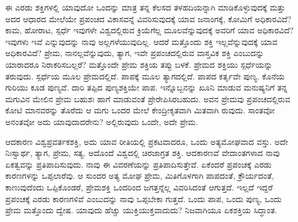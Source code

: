 ಈ ಎರಡು ಶಕ್ತಿಗಳಲ್ಲಿ ಯಾವುದೋ ಒಂದನ್ನು ಮಾತ್ರ ತನ್ನ ಕೆಲಸದ ತಳಹದಿಯನ್ನಾಗಿ ಮಾಡಿಕೊಳ್ಳುವುದಕ್ಕೆ ಮತ್ತು ಅದರ ಆಧಾರದ ಮೇಲೆಯೇ ಪ್ರಪಂಚದ ವಿಕಾಸವನ್ನೆ ವಿವರಿಸುವುದಕ್ಕೆ ಯಾವ ಜನಾಂಗಕ್ಕೆ, ಕೋಮಿಗೆ ಅಧಿಕಾರವಿದೆ? ಕಾಮ, ಹೋರಾಟ, ಸ್ಪರ್ಧೆ ಇವುಗಳೇ ವಿಶ್ವದಲ್ಲಿರುವ ಕ್ರಿಯೆಗೆಲ್ಲ ಮೂಲವೆನ್ನುವುದಕ್ಕೆ ಅವರಿಗೆ ಯಾವ ಅಧಿಕಾರವಿದೆ? ಇವುಗಳು ಇವೆ ಎನ್ನುವುದನ್ನು ನಾವು ಅಲ್ಲಗಳೆಯುವುದಿಲ್ಲ. ಆದರೆ ಮತ್ತೊಂದು ಶಕ್ತಿ ಇಲ್ಲವೆನ್ನುವುದಕ್ಕೆ ಯಾವ ಅಧಿಕಾರವಿದೆ? ಪ್ರೇಮ, ನಾನಲ್ಲವೆನ್ನುವುದು, ತ್ಯಾಗ, ಇವೇ ಪ್ರಪಂಚದಲ್ಲಿರುವ ವಾಸ್ತವಿಕ ಶಕ್ತಿ ಎಂಬುದನ್ನು ಯಾರಾದರೂ ನಿರಾಕರಿಸಬಲ್ಲರೆ? ಮತ್ತೊಂದೇ ಪ್ರೇಮ ಶಕ್ತಿಯ ತಪ್ಪು ಬಳಕೆ. ಪ್ರೇಮದ ಶಕ್ತಿಯು ಸ್ಪರ್ಧೆಯನ್ನು ತರುವುದು. ಸ್ಪರ್ಧೆಯ ಮೂಲ ಪ್ರೇಮದಲ್ಲಿದೆ. ಪಾಪಕ್ಕೆ ಮೂಲ ತ್ಯಾಗದಲ್ಲಿದೆ. ಪಾಪದ ಕರ್ತೃವೇ ಪುಣ್ಯ. ಕೊನೆಯ ಗುರಿಯು ಕೂಡ ಪುಣ್ಯವೆ. ದಾರಿ ತಪ್ಪಿದ ಪುಣ್ಯಶಕ್ತಿಯೇ ಪಾಪ. ಇನ್ನೊಬ್ಬನನ್ನು ಖೂನಿ ಮಾಡುವ ಮನುಷ್ಯನಿಗೆ ತನ್ನ ಮಗುವಿನ ಮೇಲಿನ ಪ್ರೇಮ ಬಹುಶಃ ಹಾಗೆ ಮಾಡುವಂತೆ ಪ್ರೇರೇಪಿಸಿರಬಹುದು. ಅವನ ಪ್ರೇಮವು ಪ್ರಪಂಚದಲ್ಲಿರುವ ಕೋಟಿ ಮಾನವರನ್ನು ತೊರೆದು ಆ ಮಗು ಒಂದರ ಮೇಲೆ ಕೇಂದ್ರೀಕೃತವಾಗಿ ಮಿತವಾಗಿ ರುವುದು. ಸಾಂತವೋ ಅನಂತವೋ ಅದು ಯಾವುದಾದರೇನು? ಅಲ್ಲಿರುವುದು ಒಂದೇ, ಅದೇ ಪ್ರೇಮ.

ಆದಕಾರಣ ವಿಶ್ವಪ್ರವರ್ತಕಶಕ್ತಿ, ಅದು ಯಾವ ರೀತಿಯಲ್ಲಿ ಪ್ರಕಟವಾದರೂ, ಒಂದು ಅತ್ಯಮೋಘವಾದ ವಸ್ತು. ಅದೇ ನಿಃಸ್ವಾರ್ಥ, ತ್ಯಾಗ, ಪ್ರೇಮ, ಸತ್ಯ. ಅದೊಂದೆ ವಿಶ್ವದಲ್ಲಿ ಚಿರಜಾಗ್ರತ ಶಕ್ತಿ. ಆದಕಾರಣವೆ ವೇದಾಂತಗಳಾದ ನಾವು ಏಕತ್ವವನ್ನು ಪ್ರತಿಪಾದಿಸುವುದು. ನಾವು ಈ ವಿವರಣೆಯನ್ನು ಪ್ರತಿಪಾದಿಸುತ್ತೇವೆ. ಏಕೆಂದರೆ ಪ್ರಪಂಚಕ್ಕೆ ಎರಡು ಕಾರಣಗಳನ್ನು ಒಪ್ಪಲಾರೆವು. ಆ ಸುಂದರ ಅತ್ಯ ಮೋಘ ಪ್ರೇಮ, ಮಿತಿಗೊಳಗಾಗಿ ಪಾಪದಂತೆ, ಕ್ರೌರ್ಯದಂತೆ, ಕಾಣುವುದೆಂದು ಒಪ್ಪಿಕೊಂಡರೆ, ಪ್ರೇಮಶಕ್ತಿ ಒಂದರಿಂದ ಜಗತ್ತನ್ನೆಲ್ಲ ವಿವರಿಸಿದಂತೆ ಆಗುತ್ತದೆ. ಇಲ್ಲದೆ ಇದ್ದರೆ ಪ್ರಪಂಚಕ್ಕೆ ಎರಡು ಕಾರಣಗಳಿವೆ ಎಂಬುದನ್ನು ನಾವು ಒಪ್ಪಬೇಕಾ ಗುತ್ತದೆ. ಒಂದು ಪಾಪ, ಒಂದು ಪುಣ್ಯ, ಒಂದು ಪ್ರೇಮ ಮತ್ತೊಂದು ದ್ವೇಷ. ಯಾವುದು ಹೆಚ್ಚು ಯುಕ್ತಿಯುಕ್ತವಾದುದು? ನಿಜವಾಗಿಯೂ ಏಕಶಕ್ತಿಯ ಸಿದ್ಧಾಂತ.

